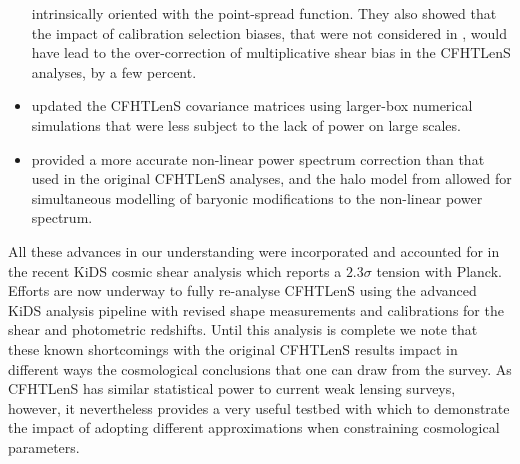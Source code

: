 \begin{itemize}
{intrinsically oriented with the point-spread function.  They also showed that
the impact of calibration selection biases, that were not considered in
\citet{CFHTLenS-shapes}, would have lead to the over-correction of
multiplicative shear bias in the CFHTLenS analyses, by a few percent.}
%
\item{\citet{joudaki/etal:2016} updated the CFHTLenS covariance matrices using
larger-box numerical simulations that were less subject to the lack of power on
large scales.}
\item{\cite{2012ApJ...761..152T} provided a more accurate non-linear power
spectrum correction than that used in the original CFHTLenS analyses, and the
halo model from \cite{2015MNRAS.454.1958M} allowed for simultaneous modelling
of baryonic modifications to the non-linear power spectrum.} 
%
\end{itemize}
%
All these advances in our understanding were incorporated and accounted for in
the recent KiDS cosmic shear analysis \citep{KiDS-450} which reports a $2.3
\sigma$ tension with Planck.  Efforts are now underway to fully re-analyse
CFHTLenS using the advanced KiDS analysis pipeline with revised shape
measurements and calibrations for the shear and photometric redshifts.  Until
this analysis is complete we note that these known shortcomings with the
original CFHTLenS results impact in different ways the cosmological conclusions
that one can draw from the survey.  As CFHTLenS has similar statistical power
to current weak lensing surveys, however, it nevertheless provides a very
useful testbed with which to demonstrate the impact of adopting different
approximations when constraining cosmological parameters.

